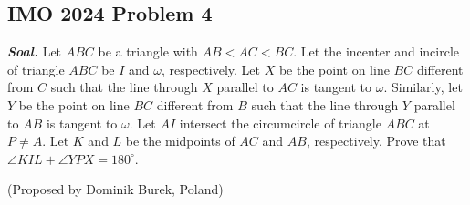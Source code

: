 \documentclass[letterpaper, 13pt]{scrartcl}
\begin{document}
\subsection{IMO 2024 Problem 4}

\textbf{\textit{Soal. }}Let $ABC$ be a triangle with $AB < AC < BC$. Let the incenter and incircle of triangle $ABC$ be $I$ and $\omega$, respectively. Let $X$ be the point on line $BC$ different from $C$ such that the line through $X$ parallel to $AC$ is tangent to $\omega$. Similarly, let $Y$ be the point on line $BC$ different from $B$ such that the line through $Y$ parallel to $AB$ is tangent to $\omega$. Let $AI$ intersect the circumcircle of triangle $ABC$ at $P \ne A$. Let $K$ and $L$ be the midpoints of $AC$ and $AB$, respectively.
Prove that $\angle KIL + \angle YPX = 180^{\circ}$.

(Proposed by Dominik Burek, Poland)
\end{document}
